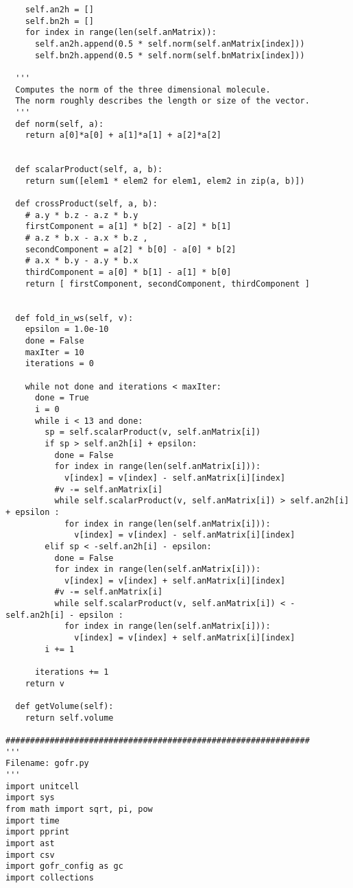 \begin{verbatim}
    self.an2h = []
    self.bn2h = []
    for index in range(len(self.anMatrix)):
      self.an2h.append(0.5 * self.norm(self.anMatrix[index]))
      self.bn2h.append(0.5 * self.norm(self.bnMatrix[index]))
              
  '''
  Computes the norm of the three dimensional molecule.
  The norm roughly describes the length or size of the vector.
  '''
  def norm(self, a):
    return a[0]*a[0] + a[1]*a[1] + a[2]*a[2]
    
  
  def scalarProduct(self, a, b):
    return sum([elem1 * elem2 for elem1, elem2 in zip(a, b)])
    
  def crossProduct(self, a, b):
    # a.y * b.z - a.z * b.y
    firstComponent = a[1] * b[2] - a[2] * b[1]
    # a.z * b.x - a.x * b.z ,
    secondComponent = a[2] * b[0] - a[0] * b[2]
    # a.x * b.y - a.y * b.x
    thirdComponent = a[0] * b[1] - a[1] * b[0]
    return [ firstComponent, secondComponent, thirdComponent ]  
  
  
  def fold_in_ws(self, v):
    epsilon = 1.0e-10
    done = False
    maxIter = 10
    iterations = 0
    
    while not done and iterations < maxIter:
      done = True
      i = 0
      while i < 13 and done:
        sp = self.scalarProduct(v, self.anMatrix[i])
        if sp > self.an2h[i] + epsilon:
          done = False
          for index in range(len(self.anMatrix[i])):
            v[index] = v[index] - self.anMatrix[i][index]
          #v -= self.anMatrix[i]
          while self.scalarProduct(v, self.anMatrix[i]) > self.an2h[i] + epsilon :
            for index in range(len(self.anMatrix[i])):
              v[index] = v[index] - self.anMatrix[i][index]
        elif sp < -self.an2h[i] - epsilon:
          done = False
          for index in range(len(self.anMatrix[i])):
            v[index] = v[index] + self.anMatrix[i][index]
          #v -= self.anMatrix[i]
          while self.scalarProduct(v, self.anMatrix[i]) < -self.an2h[i] - epsilon :
            for index in range(len(self.anMatrix[i])):
              v[index] = v[index] + self.anMatrix[i][index]
        i += 1
      
      iterations += 1
    return v
    
  def getVolume(self):
    return self.volume
   
##############################################################
'''
Filename: gofr.py
'''
import unitcell
import sys
from math import sqrt, pi, pow
import time
import pprint
import ast
import csv
import gofr_config as gc
import collections



\end{verbatim}
